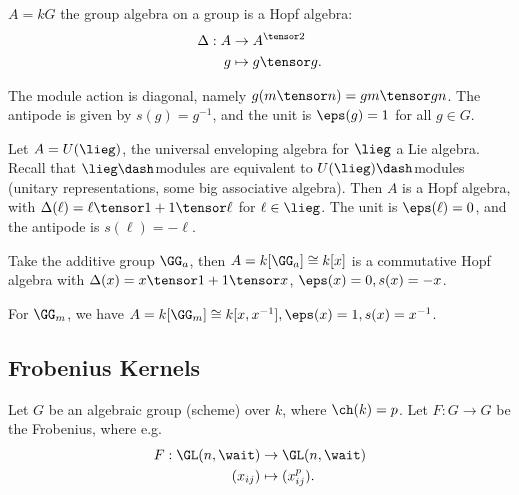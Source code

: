\begin{example}

\(A = kG\) the group algebra on a group is a Hopf algebra:
\begin{align*}  
\Delta: A &\to A^{\tensor 2} \\
g &\mapsto g\tensor g
.\end{align*}

The module action is diagonal, namely \(g(m\tensor n) = gm \tensor gn\).
The antipode is given by \(s(g) = g^{-1}\), and the unit is
\(\eps(g) = 1\) for all \(g\in G\).

\end{example}

\begin{example}

Let \(A = U(\lieg)\), the universal enveloping algebra for \(\lieg\) a
Lie algebra. Recall that \(\lieg\dash\)modules are equivalent to
\(U(\lieg)\dash\)modules (unitary representations, some big associative
algebra). Then \(A\) is a Hopf algebra, with
\(\Delta(\ell) = \ell\tensor 1 + 1\tensor \ell\) for \(\ell \in \lieg\).
The unit is \(\eps(\ell) = 0\), and the antipode is \(s(\ell) = -\ell\).

\end{example}

\begin{example}

Take the additive group \(\GG_a\), then \(A = k[\GG_a] \cong k[x]\) is a
commutative Hopf algebra with \(\Delta(x) = x\tensor 1 + 1\tensor x\),
\(\eps(x) = 0, s(x) = -x\).

\end{example}

\begin{example}

For \(\GG_m\), we have
\(A = k[\GG_m] \cong k[x, x^{-1}], \eps(x) = 1, s(x) = x^{-1}\).

\end{example}

\hypertarget{frobenius-kernels}{%
\subsection{Frobenius Kernels}\label{frobenius-kernels}}

Let \(G\) be an algebraic group (scheme) over \(k\), where
\(\ch(k) = p\). Let \(F:G\to G\) be the Frobenius, where e.g.
\begin{align*}  
F:\GL(n, \wait) &\to \GL(n, \wait)\\
(x_{ij}) & \mapsto (x_{ij}^p)
.\end{align*}

